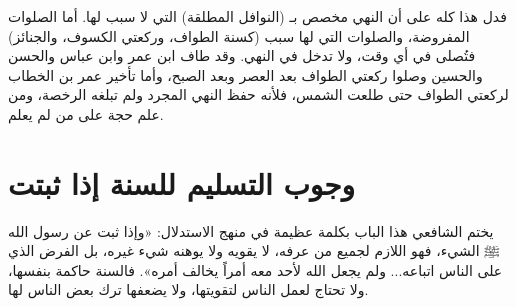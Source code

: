 فدل هذا كله على أن النهي مخصص بـ (النوافل المطلقة) التي لا سبب لها. أما الصلوات المفروضة، والصلوات التي لها سبب (كسنة الطواف، وركعتي الكسوف، والجنائز) فتُصلى في أي وقت، ولا تدخل في النهي. 
وقد طاف ابن عمر وابن عباس والحسن والحسين وصلوا ركعتي الطواف بعد العصر وبعد الصبح، وأما تأخير عمر بن الخطاب لركعتي الطواف حتى طلعت الشمس، فلأنه حفظ النهي المجرد ولم تبلغه الرخصة، ومن علم حجة على من لم يعلم.

\section{وجوب التسليم للسنة إذا ثبتت}
يختم الشافعي هذا الباب بكلمة عظيمة في منهج الاستدلال: «وإذا ثبت عن رسول الله ﷺ الشيء، فهو اللازم لجميع من عرفه، لا يقويه ولا يوهنه شيء غيره، بل الفرض الذي على الناس اتباعه... ولم يجعل الله لأحد معه أمراً يخالف أمره». 
فالسنة حاكمة بنفسها، ولا تحتاج لعمل الناس لتقويتها، ولا يضعفها ترك بعض الناس لها.